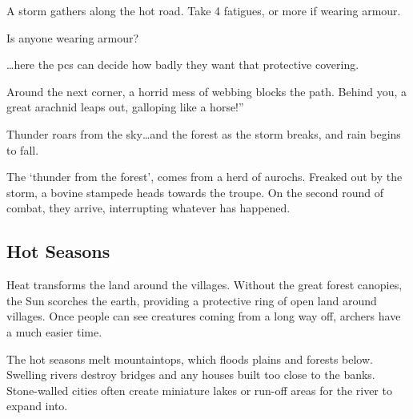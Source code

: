 \begin{multicols}{2}
\begin{exampletext}
  \begin{speechtext}
    A storm gathers along the hot road.
    Take 4 \glspl{fatigue}, or more if wearing armour.

    Is anyone wearing armour?
  \end{speechtext}

  \ldots here the \glspl{pc} can decide how badly they want that protective covering.

  \begin{speechtext}
    Around the next corner, a horrid mess of webbing blocks the path.
    Behind you, a great arachnid leaps out, galloping like a horse!''

    Thunder roars from the sky\ldots and the forest as the storm breaks, and rain begins to fall.
  \end{speechtext}

  The `thunder from the forest', comes from a herd of aurochs.
  Freaked out by the storm, a bovine stampede heads towards the troupe.
  On the second round of combat, they arrive, interrupting whatever has happened.

\end{exampletext}

\end{multicols}

\bigLine

\begin{multicols}{2}

\subsection{Hot Seasons}

\noindent
Heat transforms the land around the villages.
Without the great forest canopies, the Sun scorches the earth, providing a protective ring of open land around villages.
Once people can see creatures coming from a long way off, archers have a much easier time.

The hot seasons melt mountaintops, which floods plains and forests below.
Swelling rivers destroy bridges and any houses built too close to the banks.
Stone-walled cities often create miniature lakes or run-off areas for the river to expand into.

\setcounter{enc}{0}
\setcounter{track}{0}

\encWarmVillages

\encWarmEdge

\encWarmForest

\end{multicols}

